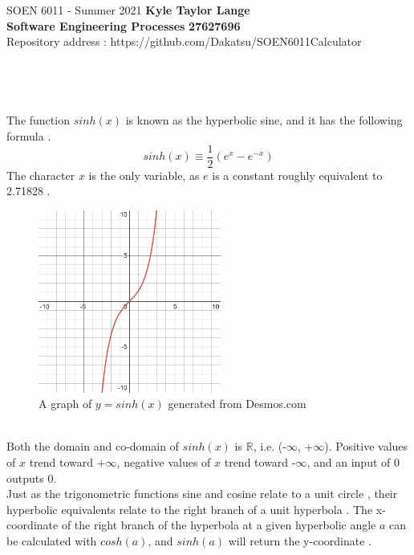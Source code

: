 \documentclass[letterpaper, 11pt]{report}
\begin{document}
\section*{}
\normalsize {SOEN 6011 - Summer 2021} \hfill \textbf{Kyle Taylor Lange} \\
\textbf{ Software Engineering Processes}  \hfill \textbf{27627696} \\
\hfill Repository address : https://github.com/Dakatsu/SOEN6011Calculator
\\\\\\\\\\
\normalsize{The function $sinh(x)$ is known as the hyperbolic sine, and it has the following formula \cite{sinh}. 
$$sinh(x) \equiv \frac{1}{2}(e^x-e^{-x})$$
The character $x$ is the only variable, as $e$ is a constant roughly equivalent to 2.71828 \cite{e}.}
\\
\begin{figure}[h]
 \centering
 \includegraphics[width= 6cm]{SOEN_6011-Problem-1/images/desmos-graph-f3.png}
  \caption{A graph of $y = sinh(x)$ generated from Desmos.com}
\end{figure}
\\
\normalsize{Both the domain and co-domain of $sinh(x)$ is $\mathbb{R}$, i.e. (-$\infty$, +$\infty$). Positive values of $x$ trend toward +$\infty$, negative values of $x$ trend toward -$\infty$, and an input of 0 outputs 0.
\\Just as the trigonometric functions sine and cosine relate to a unit circle \cite{circular}, their hyperbolic equivalents relate to the right branch of a unit hyperbola \cite{hyperbolic}. The x-coordinate of the right branch of the hyperbola at a given hyperbolic angle $a$ can be calculated with $cosh(a)$, and $sinh(a)$ will return the y-coordinate \cite{rectHyperbola}.}
\end{document}
